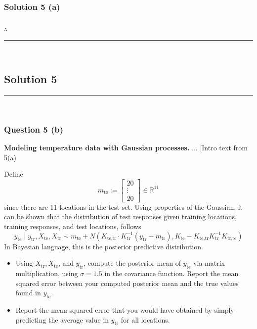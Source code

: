 \documentclass{article}
\begin{document}
\subsubsection*{Solution 5 (a)}


\subsubsection*{\normalfont}{$\therefore$ }

\noindent\rule{\textwidth}{0.4pt}\\

\newpage

\subsection*{Solution 5}
\noindent\rule{\textwidth}{0.4pt}\\
\subsubsection*{Question 5 (b)}
\begin{flushleft}
    \textbf{Modeling temperature data with Gaussian processes.} ... [Intro text from 5(a)  
    
    Define 
    \[
    m_{\text{te}} := \begin{bmatrix} 20 \\ \vdots \\ 20 \end{bmatrix} \in \mathbb{R}^{11}
    \]
    since there are 11 locations in the test set. 
    Using properties of the Gaussian, it can be shown that the distribution of test responses given training locations, training responses, and test locations, follows 
    \[
    y_{\text{te}} \mid y_{\text{tr}}, X_{\text{te}}, X_{\text{tr}} \sim m_{\text{te}} + N\left(K_{\text{te,tr}} \cdot K_{\text{tr}}^{-1}(y_{\text{tr}} - m_{\text{tr}}), K_{\text{te}} - K_{\text{te,tr}} K_{\text{tr}}^{-1} K_{\text{tr,te}}\right)
    \]
    In Bayesian language, this is the posterior predictive distribution. 
    \begin{itemize}
        \item Using $X_{\text{tr}}, X_{\text{te}}$, and $y_{\text{tr}}$, compute the posterior mean of $y_{\text{te}}$ via matrix multiplication, using $\sigma=1.5$ in the covariance function. 
        Report the mean squared error between your computed posterior mean and the true values found in $y_{\text{te}}$. 
        \item Report the mean squared error that you would have obtained by simply predicting the average value in $y_{\text{tr}}$ for all locations. 
    \end{itemize}
\end{flushleft}
\end{document}

